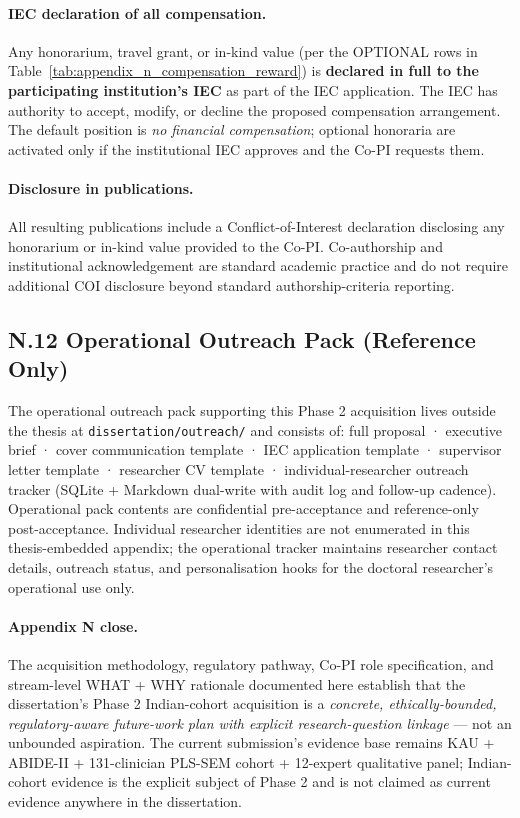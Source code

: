 \paragraph{IEC declaration of all compensation.}
Any honorarium, travel grant, or in-kind value (per the OPTIONAL rows in Table~\ref{tab:appendix_n_compensation_reward}) is \textbf{declared in full to the participating institution's IEC} as part of the IEC application. The IEC has authority to accept, modify, or decline the proposed compensation arrangement. The default position is \emph{no financial compensation}; optional honoraria are activated only if the institutional IEC approves and the Co-PI requests them.

\paragraph{Disclosure in publications.}
All resulting publications include a Conflict-of-Interest declaration disclosing any honorarium or in-kind value provided to the Co-PI. Co-authorship and institutional acknowledgement are standard academic practice and do not require additional COI disclosure beyond standard authorship-criteria reporting.

\subsection*{N.12 Operational Outreach Pack (Reference Only)}
\label{sec:appendix_n_outreach_pack}

\noindent The operational outreach pack supporting this Phase 2 acquisition lives outside the thesis at \texttt{dissertation/outreach/} and consists of: full proposal · executive brief · cover communication template · IEC application template · supervisor letter template · researcher CV template · individual-researcher outreach tracker (SQLite + Markdown dual-write with audit log and follow-up cadence). Operational pack contents are confidential pre-acceptance and reference-only post-acceptance. Individual researcher identities are not enumerated in this thesis-embedded appendix; the operational tracker maintains researcher contact details, outreach status, and personalisation hooks for the doctoral researcher's operational use only.

\paragraph{Appendix N close.}
The acquisition methodology, regulatory pathway, Co-PI role specification, and stream-level WHAT + WHY rationale documented here establish that the dissertation's Phase 2 Indian-cohort acquisition is a \emph{concrete, ethically-bounded, regulatory-aware future-work plan with explicit research-question linkage} --- not an unbounded aspiration. The current submission's evidence base remains KAU + ABIDE-II + 131-clinician PLS-SEM cohort + 12-expert qualitative panel; Indian-cohort evidence is the explicit subject of Phase 2 and is not claimed as current evidence anywhere in the dissertation.

\normalsize\normalfont\color{black}
